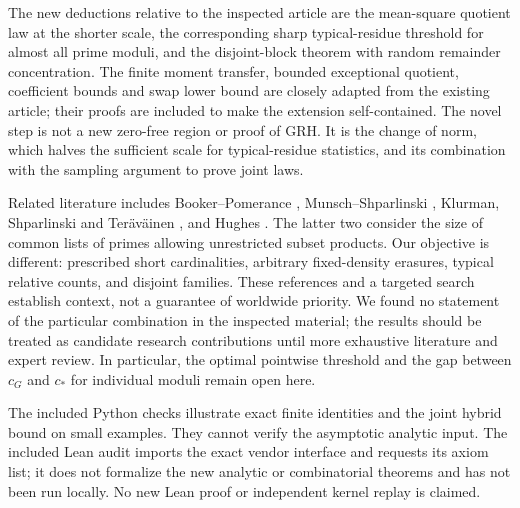 \documentclass[11pt]{article}
\theoremstyle{remark}\newtheorem{remark}[theorem]{Remark}
\begin{document}
The new deductions relative to the inspected article are the mean-square quotient law at the shorter scale, the corresponding sharp typical-residue threshold for almost all prime moduli, and the disjoint-block theorem with random remainder concentration. The finite moment transfer, bounded exceptional quotient, coefficient bounds and swap lower bound are closely adapted from the existing article; their proofs are included to make the extension self-contained. The novel step is not a new zero-free region or proof of GRH. It is the change of norm, which halves the sufficient scale for typical-residue statistics, and its combination with the sampling argument to prove joint laws.

Related literature includes Booker--Pomerance \cite{bp}, Munsch--Shparlinski \cite{ms}, Klurman, Shparlinski and Ter\"av\"ainen \cite{kst}, and Hughes \cite{hughes}. The latter two consider the size of common lists of primes allowing unrestricted subset products. Our objective is different: prescribed short cardinalities, arbitrary fixed-density erasures, typical relative counts, and disjoint families. These references and a targeted search establish context, not a guarantee of worldwide priority. We found no statement of the particular combination in the inspected material; the results should be treated as candidate research contributions until more exhaustive literature and expert review. In particular, the optimal pointwise threshold and the gap between $c_G$ and $c_*$ for individual moduli remain open here.

The included Python checks illustrate exact finite identities and the joint hybrid bound on small examples. They cannot verify the asymptotic analytic input. The included Lean audit imports the exact vendor interface and requests its axiom list; it does not formalize the new analytic or combinatorial theorems and has not been run locally. No new Lean proof or independent kernel replay is claimed.
\end{document}
